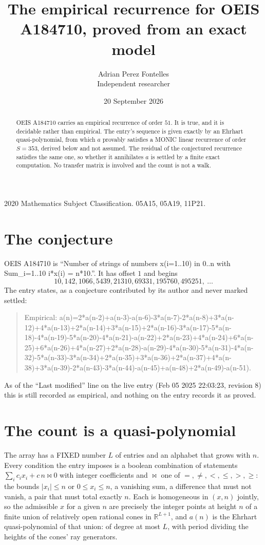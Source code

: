 \documentclass[11pt,a4paper]{article}
\title{The empirical recurrence for OEIS A184710, proved from an exact model}
\author{Adrian Perez Fontelles\\ \small Independent researcher}
\date{20 September 2026}
\theoremstyle{plain}
\theoremstyle{definition}
\begin{document}
\maketitle

\begin{abstract}
OEIS A184710 carries an empirical recurrence of order $51$. It is true, and it is
decidable rather than empirical. The entry's sequence is given exactly by an Ehrhart quasi-polynomial, from
which $a$ provably satisfies a MONIC linear recurrence of order $S=353$, derived below and not
assumed. The residual of the conjectured recurrence satisfies the same one, so whether it
annihilates $a$ is settled by a finite exact computation. No transfer matrix is involved and the count is not a walk.
\end{abstract}

\noindent\small 2020 Mathematics Subject Classification. 05A15, 05A19, 11P21.\normalsize

\section{The conjecture}

OEIS A184710 is ``Number of strings of numbers x(i=1..10) in 0..n with Sum\_{i=1..10} i*x(i) = n*10.''. It has offset $1$ and begins
\[
10, 142, 1066, 5439, 21310, 69331, 195760, 495251,\ \dots
\]
The entry states, as a conjecture contributed by its author and never marked settled:
\begin{quote}
Empirical: a(n)=2*a(n-2)+a(n-3)-a(n-6)-3*a(n-7)-2*a(n-8)+3*a(n-12)+4*a(n-13)+2*a(n-14)+3*a(n-15)+2*a(n-16)-3*a(n-17)-5*a(n-18)-4*a(n-19)-5*a(n-20)-4*a(n-21)-a(n-22)+2*a(n-23)+4*a(n-24)+6*a(n-25)+6*a(n-26)+4*a(n-27)+2*a(n-28)-a(n-29)-4*a(n-30)-5*a(n-31)-4*a(n-32)-5*a(n-33)-3*a(n-34)+2*a(n-35)+3*a(n-36)+2*a(n-37)+4*a(n-38)+3*a(n-39)-2*a(n-43)-3*a(n-44)-a(n-45)+a(n-48)+2*a(n-49)-a(n-51).
\end{quote}
As of the ``Last modified'' line on the live entry (Feb 05 2025 22:03:23, revision 8)
this is still recorded as empirical, and nothing on the entry records it as proved.

\section{The count is a quasi-polynomial}

The array has a FIXED number $L$ of entries and an alphabet that grows with $n$. Every
condition the entry imposes is a boolean combination of statements
$\sum_i c_ix_i + c\,n \bowtie 0$ with integer coefficients and $\bowtie$ one of
$=,\ne,<,\le,>,\ge$: the bounds $|x_i|\le n$ or $0\le x_i\le n$, a vanishing sum, a difference
that must not vanish, a pair that must total exactly $n$. Each is homogeneous in $(x,n)$
jointly, so the admissible $x$ for a given $n$ are precisely the integer points at height $n$
of a finite union of relatively open rational cones in $\mathbb{R}^{L+1}$, and $a(n)$ is
the Ehrhart quasi-polynomial of that union: of degree at most $L$, with period dividing the
heights of the cones' ray generators.
\end{document}

